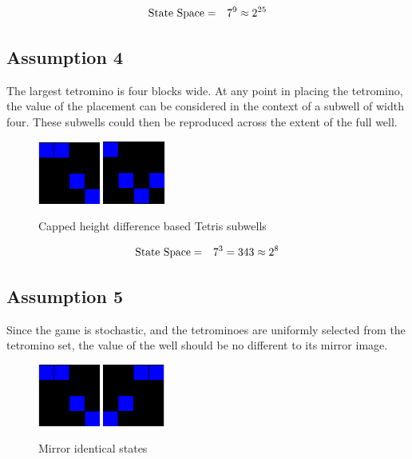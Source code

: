 \documentclass{rucsthesis}
\begin{document}
\begin{eqnarray}
\centering
\textrm{State Space} & = & 7^{9} \approx 2^{25}
\end{eqnarray}

\subsection*{Assumption 4}

The largest tetromino is four blocks wide. At any point in placing the tetromino, the value of the placement can be considered in the context of a subwell of width four. These subwells could then be reproduced across the extent of the full well.

\begin{figure}[h]
\centering
\includegraphics[width=0.8in]{reducedwell.png}
\includegraphics[width=0.8in]{reducedwell2.png}
\caption{Capped height difference based Tetris subwells}
\label{fig:redwell}
\end{figure}

\begin{eqnarray}
\centering
\textrm{State Space} & = & 7^{3} = 343 \approx 2^{8}
\end{eqnarray}

\subsection*{Assumption 5}

Since the game is stochastic, and the tetrominoes are uniformly selected from the tetromino set, the value of the well should be no different to its mirror image.

\begin{figure}[h]
\centering
\includegraphics[width=0.8in]{reducedwell.png}
\includegraphics[width=0.8in]{mirrorwell.png}
\caption{Mirror identical states}
\label{fig:mirrorwell}
\end{figure}
\end{document}
